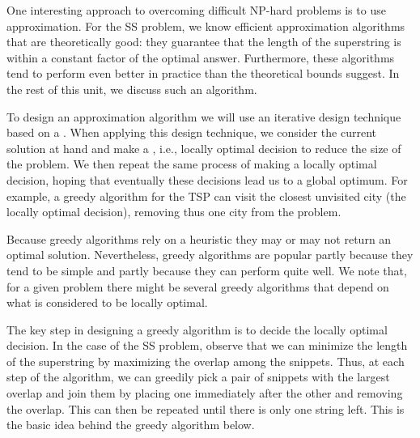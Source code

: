 \begin{cluster}
\label{grp:grm:genome::interesting}

\begin{gram}
\label{grm:genome::interesting}
One interesting approach to overcoming difficult NP-hard problems is
to use approximation.
For the SS problem, we know efficient approximation
algorithms that are theoretically good: they guarantee that the length
of the superstring is within a constant factor of the optimal answer.
Furthermore, these algorithms tend to perform even better in practice
than the theoretical bounds suggest.
In the rest of this unit, we discuss such an algorithm.

\end{gram}
\end{cluster}

\begin{cluster}
\label{grp:grm:genome::greedy-algorithms}

\begin{gram}
\label{grm:genome::greedy-algorithms}
To design an approximation algorithm we will use an iterative design
technique based on a .
When applying this design technique, we consider the current solution
at hand and make a , i.e., locally optimal decision to
reduce the size of the problem.
We then repeat the same process of making a locally optimal decision,
hoping that eventually these decisions lead us to a global optimum.
For example, a greedy algorithm for the TSP can visit the closest
unvisited city (the locally optimal decision), removing thus one city
from the problem.

Because greedy algorithms rely on a heuristic they may or may not
return an optimal solution.
Nevertheless, greedy algorithms are popular partly because they tend
to be simple and partly because they can perform quite well.
We note that, for a given problem there might be several greedy
algorithms that depend on what is considered to be locally optimal.

\end{gram}
\end{cluster}

\begin{cluster}
\label{grp:grm:genome::step}

\begin{gram}
\label{grm:genome::step}
The key step in designing a greedy algorithm is to decide the locally
optimal decision.
In the case of the SS problem, observe that we can minimize the length
of the superstring by maximizing the overlap among the snippets.
Thus, at each step of the algorithm, we can greedily pick a pair of
snippets with the largest overlap and join them by placing one
immediately after the other and removing the overlap.  
This can then be repeated until there is only one string left.
This is the basic idea behind the greedy algorithm below.

\end{gram}
\end{cluster}


